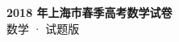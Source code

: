 \documentclass[zihao=-4, a4paper]{ctexart}
\begin{document}
\begin{center}
  {\Large\bfseries 2018 年上海市春季高考数学试卷}\\[4pt]
  {\large 数学 · 试题版}
\end{center}
\medskip
{}

\end{document}
